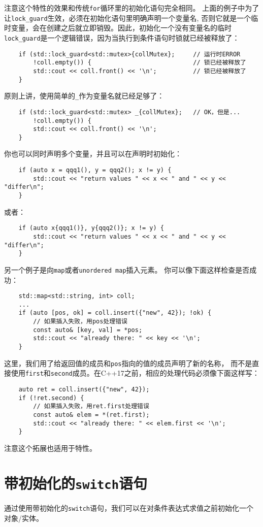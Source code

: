 注意这个特性的效果和传统\texttt{for}循环里的初始化语句完全相同。
上面的例子中为了让\texttt{lock\_guard}生效，必须在初始化语句里明确声明一个变量名,
否则它就是一个临时变量，会在创建之后就立即销毁。因此，初始化一个没有变量名的临时
\texttt{lock\_guard}是一个逻辑错误，因为当执行到条件语句时锁就已经被释放了：
\begin{lstlisting}
    if (std::lock_guard<std::mutex>{collMutex};     // 运行时ERROR
        !coll.empty()) {                            // 锁已经被释放了
        std::cout << coll.front() << '\n';          // 锁已经被释放了
    }
\end{lstlisting}
原则上讲，使用简单的\texttt{\_}作为变量名就已经足够了：
\begin{lstlisting}
    if (std::lock_guard<std::mutex> _{collMutex};   // OK，但是...
        !coll.empty()) {
        std::cout << coll.front() << '\n';
    }
\end{lstlisting}
你也可以同时声明多个变量，并且可以在声明时初始化：
\begin{lstlisting}
    if (auto x = qqq1(), y = qqq2(); x != y) {
        std::cout << "return values " << x << " and " << y << "differ\n";
    }
\end{lstlisting}
或者：
\begin{lstlisting}
    if (auto x{qqq1()}, y{qqq2()}; x != y) {
        std::cout << "return values " << x << " and " << y << "differ\n";
    }
\end{lstlisting}
另一个例子是向\texttt{map}或者\texttt{unordered map}插入元素。
你可以像下面这样检查是否成功：
\begin{lstlisting}
    std::map<std::string, int> coll;
    ...
    if (auto [pos, ok] = coll.insert({"new", 42}); !ok) {
        // 如果插入失败，用pos处理错误
        const auto& [key, val] = *pos;
        std::cout << "already there: " << key << '\n';
    }
\end{lstlisting}
这里，我们用了给返回值的成员和\texttt{pos}指向的值的成员声明了新的名称，
而不是直接使用\texttt{first}和\texttt{second}成员。在C++17之前，相应的处理代码必须像下面这样写：
\begin{lstlisting}
    auto ret = coll.insert({"new", 42});
    if (!ret.second) {
        // 如果插入失败，用ret.first处理错误
        const auto& elem = *(ret.first);
        std::cout << "already there: " << elem.first << '\n';
    }
\end{lstlisting}
注意这个拓展也适用于特性。

\section{带初始化的\texttt{switch}语句}\label{ch2.2}
通过使用带初始化的\texttt{switch}语句，我们可以在对条件表达式求值之前初始化一个对象/实体。

